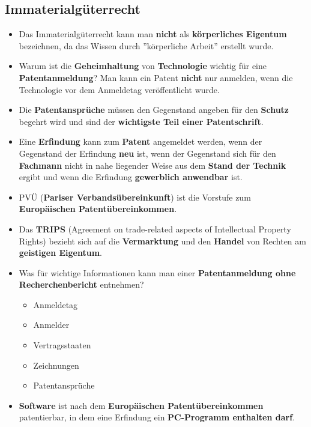 \subsection{Immaterialgüterrecht}
\begin{itemize}
	\item Das Immaterialgüterrecht kann man \textbf{nicht} als \textbf{körperliches Eigentum} bezeichnen, da das Wissen durch ''körperliche Arbeit'' erstellt wurde.
	\item Warum ist die \textbf{Geheimhaltung} von \textbf{Technologie} wichtig für eine \textbf{Patentanmeldung}? Man kann ein Patent \textbf{nicht} nur anmelden, wenn die Technologie vor dem Anmeldetag veröffentlicht wurde.
	\item Die \textbf{Patentansprüche} müssen den Gegenstand angeben für den \textbf{Schutz} begehrt wird und sind der \textbf{wichtigste Teil einer Patentschrift}.
	\item Eine \textbf{Erfindung} kann zum \textbf{Patent} angemeldet werden, wenn der Gegenstand der Erfindung \textbf{neu} ist, wenn der Gegenstand sich für den \textbf{Fachmann} nicht in nahe liegender Weise aus dem \textbf{Stand der Technik} ergibt und wenn die Erfindung \textbf{gewerblich anwendbar} ist.
	\item PVÜ (\textbf{Pariser Verbandsübereinkunft}) ist die Vorstufe zum \textbf{Europäischen Patentübereinkommen}.
	\item Das \textbf{TRIPS} (Agreement on trade-related aspects of Intellectual Property Rights) bezieht sich auf die \textbf{Vermarktung} und den \textbf{Handel} von Rechten am \textbf{geistigen Eigentum}.
	\item Was für wichtige Informationen kann man einer \textbf{Patentanmeldung ohne Recherchenbericht} entnehmen?
	\begin{itemize}
		\item Anmeldetag
		\item Anmelder
		\item Vertragsstaaten
		\item Zeichnungen
		\item Patentansprüche
	\end{itemize}
	\item \textbf{Software} ist nach dem \textbf{Europäischen Patentübereinkommen} patentierbar, in dem eine Erfindung ein \textbf{PC-Programm enthalten darf}.
\end{itemize}

